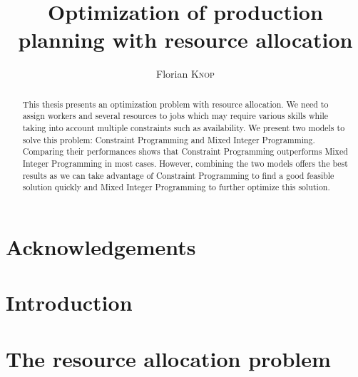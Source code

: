 \documentclass[twoside]{template/EPL-master-thesis-covers-EN}
\title{Optimization of production planning with resource allocation}
\author{Florian \textsc{Knop}}
\begin{document}
  \def\chapterautorefname{Chapter}
  \def\sectionautorefname{Section}
  \def\subsectionautorefname{Subsection}
  \newcommand*{\Appendixautorefname}{Appendix}
  \newcommand{\vone}{Village n\textsuperscript{o}1}

  
  \maketitle


  \clearpage\null\newpage
  \cleardoublepage


  \begin{abstract}
    \normalsize
    This thesis presents an optimization problem with resource allocation. 
    We need to assign workers and several resources to jobs which may require various skills while 
    taking into account multiple constraints such as availability.
    We present two models to solve this problem: Constraint Programming and Mixed Integer Programming.
    Comparing their performances shows that Constraint Programming outperforms Mixed Integer Programming in 
    most cases. However, combining the two models offers the best results as we can take advantage 
    of Constraint Programming to find a good feasible solution quickly and Mixed Integer Programming to further optimize this solution.
  \end{abstract}


  \chapter*{Acknowledgements}

  
  
  \tableofcontents


  \listoffigures

  \listoftables




  \chapter{Introduction}
  \label{chapter:introduction}
  


  \chapter{The resource allocation problem}
  \label{chapter:problem}
  
\end{document}
